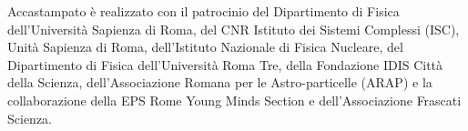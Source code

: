 \vspace{1cm}
Accastampato è realizzato con il patrocinio
del Dipartimento di Fisica dell'Università Sapienza di Roma, %
del CNR Istituto dei Sistemi Complessi (ISC), Unità Sapienza di Roma, %
dell'Istituto Nazionale di Fisica Nucleare, %
del Dipartimento di Fisica dell'Università Roma Tre, %
della Fondazione IDIS Città della Scienza, %
dell'Associazione Romana per le Astro-particelle (ARAP) %
e la collaborazione della EPS Rome Young Minds Section
e dell'Associazione Frascati Scienza.
\begin{center}
~~~~~\\
\end{center}

\vspace{.3em}
\begin{center}
~
\end{center}



